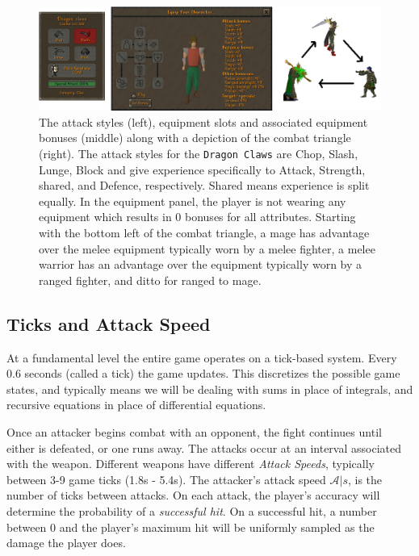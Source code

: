 


		\begin{figure}
			\centering
			\includegraphics[width=\linewidth]{img/combat/Equipment_Stats_interface_and_triangle.png}
			\caption{The attack styles (left), equipment slots and associated equipment bonuses (middle) along with a depiction of the combat triangle (right). The attack styles for the \texttt{Dragon Claws} are Chop, Slash, Lunge, Block and give experience specifically to Attack, Strength, shared, and Defence, respectively. Shared means experience is split equally. In the equipment panel, the player is not wearing any equipment which results in 0 bonuses for all attributes. Starting with the bottom left of the combat triangle, a mage has advantage over the melee equipment typically worn by a melee fighter, a melee warrior has an advantage over the equipment typically worn by a ranged fighter, and ditto for ranged to mage.
			}
			\label{fig:equipment_stats_and_triangle}
		\end{figure}


	\subsection{Ticks and Attack Speed}
		At a fundamental level the entire game operates on a tick-based system. Every 0.6 seconds (called a tick) the game updates. This discretizes the possible game states, and typically means we will be dealing with sums in place of integrals, and recursive equations in place of differential equations.

		Once an attacker begins combat with an opponent, the fight continues until either is defeated, or one runs away. The attacks occur at an interval associated with the weapon. Different weapons have different \textit{Attack Speeds}, typically between 3-9 game ticks (1.8s - 5.4s). The attacker's attack speed $\mathcal{A}|s$, is the number of ticks between attacks. On each attack, the player's accuracy will determine the probability of a \textit{successful hit}. On a successful hit, a number between 0 and the player's maximum hit will be uniformly sampled as the damage the player does.

